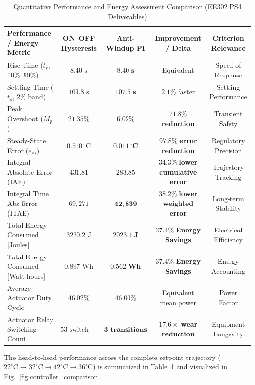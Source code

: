 \documentclass[conference]{IEEEtran}
\begin{document}
\begin{table}[t]
\caption{Quantitative Performance and Energy Assessment Comparison (EE302 PS4 Deliverables)}
\label{tab:metrics_comparison}
\centering
\begin{tabular}{@{}lcccc@{}}
\toprule
\textbf{Performance / Energy Metric} & \textbf{ON--OFF Hysteresis} & \textbf{Anti-Windup PI} & \textbf{Improvement / Delta} & \textbf{Criterion Relevance} \\ \midrule
Rise Time ($t_r$, 10\%--90\%) & $8.40\text{ s}$ & $\mathbf{8.40\text{ s}}$ & Equivalent & Speed of Response \\
Settling Time ($t_s$, 2\% band) & $109.8\text{ s}$ & $\mathbf{107.5\text{ s}}$ & $2.1\%$ faster & Settling Performance \\
Peak Overshoot ($M_p$) & $21.35\%$ & $\mathbf{6.02\%}$ & $\mathbf{71.8\%}$ \textbf{reduction} & Transient Safety \\
Steady-State Error ($e_{ss}$) & $0.510\,^\circ\text{C}$ & $\mathbf{0.011\,^\circ\text{C}}$ & $\mathbf{97.8\%}$ \textbf{error reduction} & Regulatory Precision \\
Integral Absolute Error (IAE) & $431.81$ & $\mathbf{283.85}$ & $\mathbf{34.3\%}$ \textbf{lower cumulative error} & Trajectory Tracking \\
Integral Time Abs Error (ITAE) & $69,271$ & $\mathbf{42,839}$ & $\mathbf{38.2\%}$ \textbf{lower weighted error} & Long-term Stability \\
Total Energy Consumed [Joules] & $3230.2\text{ J}$ & $\mathbf{2023.1\text{ J}}$ & $\mathbf{37.4\%}$ \textbf{Energy Savings} & Electrical Efficiency \\
Total Energy Consumed [Watt-hours] & $0.897\text{ Wh}$ & $\mathbf{0.562\text{ Wh}}$ & $\mathbf{37.4\%}$ \textbf{Energy Savings} & Energy Accounting \\
Average Actuator Duty Cycle & $46.02\%$ & $\mathbf{46.00\%}$ & Equivalent mean power & Power Factor \\
Actuator Relay Switching Count & $53\text{ switch cycles}$ & $\mathbf{3\text{ transitions}}$ & $\mathbf{17.6\times}$ \textbf{wear reduction} & Equipment Longevity \\ \bottomrule
\end{tabular}
\end{table}

The head-to-head performance across the complete setpoint trajectory ($22^\circ\text{C} \to 32^\circ\text{C} \to 42^\circ\text{C} \to 36^\circ\text{C}$) is summarized in Table~\ref{tab:metrics_comparison} and visualized in Fig.~\ref{fig:controller_comparison}.
\end{document}
